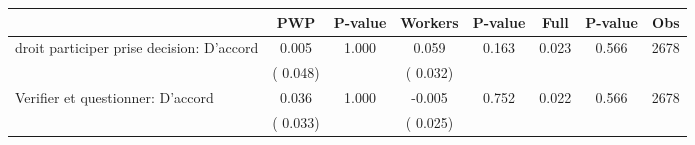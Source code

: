 
\begin{tabular}{l*{7}{c}}\hline&\multicolumn{1}{c}{PWP}&\multicolumn{1}{c}{P-value}&\multicolumn{1}{c}{Workers}&\multicolumn{1}{c}{P-value}&\multicolumn{1}{c}{Full}&\multicolumn{1}{c}{P-value}&\multicolumn{1}{c}{Obs} \\ \hline

 droit participer prise decision: D'accord       &              0.005       &        1.000  &              0.059       &        0.163  &              0.023       &              0.566 &  2678 \\ 
                       &       (       0.048)             &                               &       (       0.032)                     &                               &                                               &                                &                      \\ 

 Verifier et questionner: D'accord       &              0.036       &        1.000  &             -0.005       &        0.752  &              0.022       &              0.566 &  2678 \\ 
                       &       (       0.033)             &                               &       (       0.025)                     &                               &                                               &                                &                      \\ 

\hline \end{tabular}
